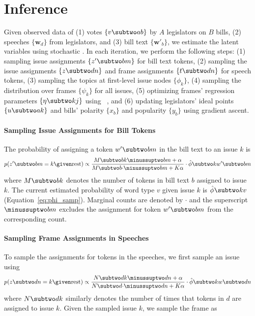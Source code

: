 
\section{Inference}
\label{sec:c6_inference}




Given observed data of (1) votes $\{v \subtwo ab\}$ by $A$ legislators
on $B$ bills, (2) speeches $\{\bm w_d\}$ from legislators, and
(3) bill text $\{\bm w'_b\}$, we estimate the latent variables using stochastic
. In each iteration, we perform the following steps: (1) sampling issue assignments
$\{z' \subtwo bm\}$ for bill text tokens, (2) sampling the
issue assignments $\{z \subtwo dn\}$ and frame assignments $\{t
\subtwo dn\}$ for speech tokens, (3) sampling the topics at
first-level issue nodes $\{\phi_k\}$, (4) sampling the distribution
over frames $\{\psi_k\}$ for all issues, (5) optimizing frames'
regression parameters $\{\eta \subtwo kj\}$ using
~\cite{Liu:MP89:lbfgs}, and (6) updating legislators' ideal points $\{u \subtwo ak\}$ and bills'
polarity $\{x_b\}$ and popularity $\{y_b\}$ using gradient ascent.

\paragraph{Sampling Issue Assignments for Bill Tokens}
\label{subsec:c6_sample_zprime}

The probability of assigning a token $w' \subtwo bm$ in the bill text
to an issue $k$ is
\begin{equation}
  p(z' \subtwo bm = k \given \mbox{rest}) \propto
  \frac{M \subtwo bk \minussuptwo bm + \alpha}{M \subtwo b{\cdot} \minussuptwo bm + K \alpha} \cdot
  \hat{\phi} \subtwo k{w' \subtwo bm}
\end{equation}
where $M \subtwo bk$ denotes the number of tokens in bill text $b$
assigned to issue $k$.  The current estimated probability of
word type $v$ given issue $k$ is $\hat{\phi} \subtwo kv$
(Equation~\ref{eq:phi_samp}). Marginal counts are denoted by $\cdot$
and the superscript $\minussuptwo bm$ excludes the assignment for
token $w' \subtwo bm$ from the corresponding count.

\paragraph{Sampling Frame Assignments in Speeches}
\label{subsec:c6_sample_zt}

To sample the assignments for tokens in the speeches, we first sample
an issue using
\begin{equation}
  p(z \subtwo dn = k \given \mbox{rest}) \propto
  \frac{N \subtwo dk \minussuptwo dn + \alpha}{N \subtwo d{\cdot} \minussuptwo dn + K \alpha} \cdot
  \hat{\phi} \subtwo k{w \subtwo dn}
  
\end{equation}
where $N \subtwo dk$ similarly denotes the number of times that tokens
in $d$ are assigned to issue $k$. Given the sampled issue $k$, we
sample the frame as 

